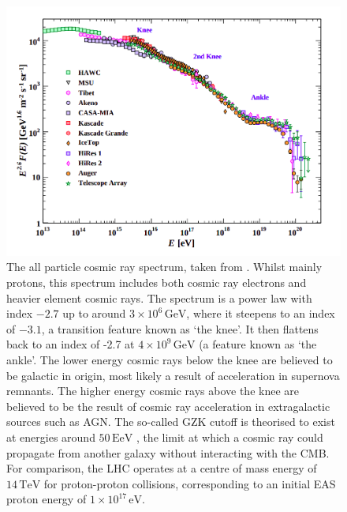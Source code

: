 \begin{figure}
\begin{center}  

\includegraphics[width=\columnwidth]{figures/pdgcr.png}
 
\caption{The all particle cosmic ray spectrum, taken from \cite{pdg}. Whilst mainly protons, this spectrum includes both cosmic ray electrons and heavier element cosmic rays. The spectrum is a power law with index $\mathrm{-2.7}$ up to around $\mathrm{3 \times 10^6\,GeV}$, where it steepens to an index of $\mathrm{-3.1}$, a transition feature known as `the knee'. It then flattens back to an index of -2.7 at $\mathrm{4 \times 10^9\,GeV}$ (a feature known as `the ankle'. The lower energy cosmic rays below the knee are believed to be galactic in origin, most likely a result of acceleration in supernova remnants. The higher energy cosmic rays above the knee are believed to be the result of cosmic ray acceleration in extragalactic sources such as AGN. The so-called GZK cutoff is theorised to exist at energies around $\mathrm{50\, EeV}$ \cite{gzk}, the limit at which a cosmic ray could propagate from another galaxy without interacting with the CMB. For comparison, the LHC operates at a centre of mass energy of $\mathrm{14\,TeV}$ for proton-proton collisions, corresponding to an initial EAS proton energy of $\mathrm{1\times 10^{17}\,eV}$.}
\label{fig:crspec}
\end{center}
\end{figure}

